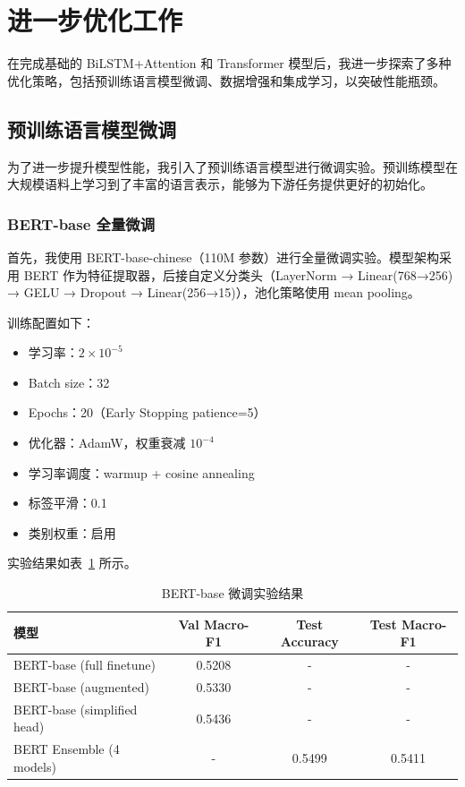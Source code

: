 \documentclass[a4paper]{article}
\begin{document}
\section{进一步优化工作}

在完成基础的 BiLSTM+Attention 和 Transformer 模型后，我进一步探索了多种优化策略，包括预训练语言模型微调、数据增强和集成学习，以突破性能瓶颈。

\subsection{预训练语言模型微调}

为了进一步提升模型性能，我引入了预训练语言模型进行微调实验。预训练模型在大规模语料上学习到了丰富的语言表示，能够为下游任务提供更好的初始化。

\subsubsection{BERT-base 全量微调}

首先，我使用 BERT-base-chinese（110M 参数）进行全量微调实验。模型架构采用 BERT 作为特征提取器，后接自定义分类头（LayerNorm → Linear(768→256) → GELU → Dropout → Linear(256→15)），池化策略使用 mean pooling。

训练配置如下：
\begin{itemize}
    \item 学习率：$2 \times 10^{-5}$
    \item Batch size：32
    \item Epochs：20（Early Stopping patience=5）
    \item 优化器：AdamW，权重衰减 $10^{-4}$
    \item 学习率调度：warmup + cosine annealing
    \item 标签平滑：0.1
    \item 类别权重：启用
\end{itemize}

实验结果如表~\ref{tab:bert_results} 所示。

\begin{table}[H]
    \centering
    \small
    \begin{tabular}{|l|c|c|c|}
        \hline
        \textbf{模型} & \textbf{Val Macro-F1} & \textbf{Test Accuracy} & \textbf{Test Macro-F1} \\
        \hline
        BERT-base (full finetune) & 0.5208 & - & - \\
        BERT-base (augmented) & 0.5330 & - & - \\
        BERT-base (simplified head) & 0.5436 & - & - \\
        BERT Ensemble (4 models) & - & 0.5499 & 0.5411 \\
        \hline
    \end{tabular}
    \caption{BERT-base 微调实验结果}
    \label{tab:bert_results}
\end{table}
\end{document}
